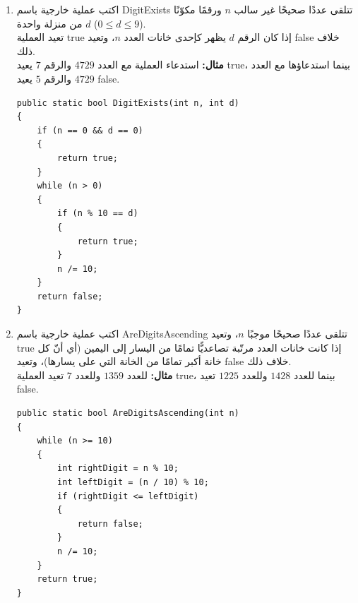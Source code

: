 \documentclass[14pt]{extarticle}
\begin{document}
\begin{enumerate}[itemsep=2em]
\item اكتب عملية خارجية باسم \textenglish{DigitExists} تتلقى عددًا صحيحًا غير سالب $n$ ورقمًا مكوّنًا من منزلة واحدة $d$ ($0 \le d \le 9$). \\
تعيد العملية \textenglish{true} إذا كان الرقم $d$ يظهر كإحدى خانات العدد $n$، وتعيد \textenglish{false} خلاف ذلك. \\
\textbf{مثال:} استدعاء العملية مع العدد $4729$ والرقم $7$ يعيد \textenglish{true}، بينما استدعاؤها مع العدد $4729$ والرقم $5$ يعيد \textenglish{false}.
\ifwithsols
\begin{boxSolution}
\begin{english}
\begin{verbatim}
public static bool DigitExists(int n, int d)
{
    if (n == 0 && d == 0)
    {
        return true;
    }
    while (n > 0)
    {
        if (n % 10 == d)
        {
            return true;
        }
        n /= 10;
    }
    return false;
}
\end{verbatim}
\end{english}
\end{boxSolution}
\fi
\filbreak

\item اكتب عملية خارجية باسم \textenglish{AreDigitsAscending} تتلقى عددًا صحيحًا موجبًا $n$، وتعيد \textenglish{true} إذا كانت خانات العدد مرتّبة تصاعديًّا تمامًا من اليسار إلى اليمين (أي أنّ كل خانة أكبر تمامًا من الخانة التي على يسارها)، وتعيد \textenglish{false} خلاف ذلك. \\
\textbf{مثال:} للعدد $1359$ وللعدد $7$ تعيد العملية \textenglish{true}، بينما للعدد $1428$ وللعدد $1225$ تعيد \textenglish{false}.
\ifwithsols
\begin{boxSolution}
\begin{english}
\begin{verbatim}
public static bool AreDigitsAscending(int n)
{
    while (n >= 10)
    {
        int rightDigit = n % 10;
        int leftDigit = (n / 10) % 10;
        if (rightDigit <= leftDigit)
        {
            return false;
        }
        n /= 10;
    }
    return true;
}
\end{verbatim}
\end{english}
\end{boxSolution}
\fi
\filbreak


\end{enumerate}
\end{document}
